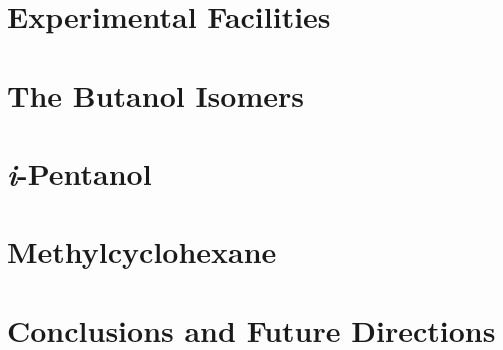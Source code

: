 \documentclass[12pt,letterpaper,oneside,draft]{book}
\begin{document}
\chapter{Experimental Facilities}
\label{chap:facilities}

\cleardoublepage

\chapter{The Butanol Isomers}
\label{chap:buoh}

\cleardoublepage

\chapter{\textit{i}-Pentanol}
\label{chap:peoh}

\cleardoublepage

\chapter{Methylcyclohexane}
\label{chap:mch}

\cleardoublepage

\chapter{Conclusions and Future Directions}
\label{chap:conclusions}

\cleardoublepage

\printbibliography[heading=bibintoc]
\end{document}
